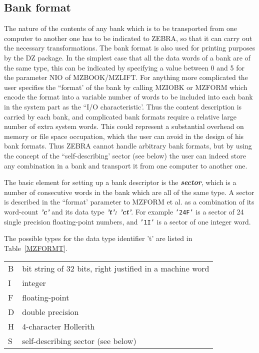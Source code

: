 \subsection{Bank format}
\par The nature of the contents of any bank which is to be transported
from one computer to another one has to be indicated to ZEBRA,
so that it can carry out the necessary transformations.
The bank format is also used for printing purposes by the DZ package.
In the simplest case that all the data words of a bank are
of the same type, this can be indicated by specifying a value between 0
and 5 for the parameter NIO of MZBOOK/MZLIFT.
For anything more complicated the user specifies the ``format'
of the bank by calling MZIOBK or MZFORM which encode the format
into a variable number of words to be included into each bank
in the system part as the ``I/O characteristic'.
Thus the content description is carried by each bank,
and complicated bank formats require a relative large number
of extra system words.
This could represent a substantial overhead on memory
or file space occupation,
which the user can avoid in the design of his bank formats.
Thus ZEBRA cannot handle arbitrary bank formats,
but by using the concept of the ``self-describing' sector (see below)
the user can indeed store any combination in a bank
and transport it from one computer to another one.
\par The basic element for setting up a bank descriptor is the
{\bf\it sector},
which is a number of consecutive words in the bank which are
all of the same type.
A sector is described in the ``format' parameter to MZFORM et al.
as a combination of its word-count
{\bf\it 'c'} and its data type {\bf\it 't': 'ct'}.
For example
{\tt '24F'}
is a sector of 24 single precision floating-point
numbers, and {\tt '1I'}
is a sector of one integer word.
\par The possible types for the data type identifier 't'
are listed in Table~\ref{MZFORMT}.
\begin{center}\begin{tabular}{|l|l|}
\caption{MZFORM data type identifier syntax}
\label{MZFORMT}
\hline
B&bit string of 32 bits, right justified in a machine word\\
I&integer\\
F&floating-point\\
D&double precision\\
H&4-character Hollerith\\
S&self-describing sector (see below)\\ \hline
\end{tabular}\end{center}
